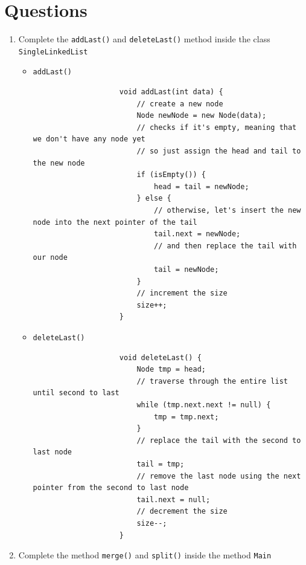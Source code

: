 \documentclass[12pt,titlepage]{article}
\begin{document}
\section{Questions}
\begin{enumerate}
    \item {
        Complete the \texttt{addLast()} and \texttt{deleteLast()} method inside the class\\
        \texttt{SingleLinkedList}

        \begin{itemize}
            \item {
                \texttt{addLast()}
                \begin{verbatim}
                    void addLast(int data) {
                        // create a new node
                        Node newNode = new Node(data);
                        // checks if it's empty, meaning that we don't have any node yet
                        // so just assign the head and tail to the new node
                        if (isEmpty()) {
                            head = tail = newNode;
                        } else {
                            // otherwise, let's insert the new node into the next pointer of the tail
                            tail.next = newNode;
                            // and then replace the tail with our node
                            tail = newNode;
                        }
                        // increment the size
                        size++;
                    }
                \end{verbatim}
            }
            \item {
                \texttt{deleteLast()}
                \begin{verbatim}
                    void deleteLast() {
                        Node tmp = head;
                        // traverse through the entire list until second to last
                        while (tmp.next.next != null) {
                            tmp = tmp.next;
                        }
                        // replace the tail with the second to last node
                        tail = tmp;
                        // remove the last node using the next pointer from the second to last node
                        tail.next = null;
                        // decrement the size
                        size--;
                    }
                \end{verbatim}
            }
        \end{itemize}
    }
    \pagebreak
    \item {
        Complete the method \texttt{merge()} and \texttt{split()} inside the method \texttt{Main}

}
\end{enumerate}
\end{document}
